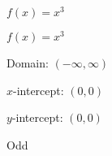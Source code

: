 {$f(x) = x^3$}
{$f(x) = x^3$ 

Domain: $(-\infty, \infty)$ 

$x$-intercept: $(0, 0)$ 

$y$-intercept: $(0, 0)$ 

Odd

\begin{center}
\end{center}
}